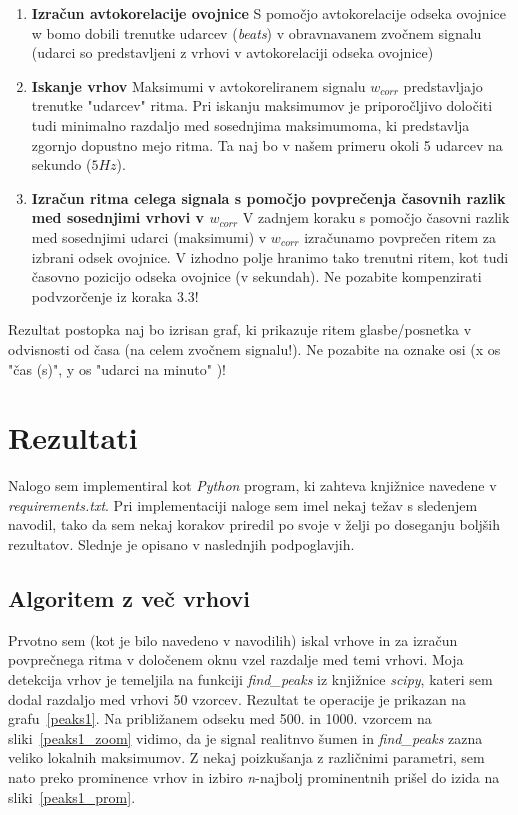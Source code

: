 \documentclass[a4paper,11pt]{article}
\begin{document}
\begin{enumerate}
	\begin{enumerate}[label*=\arabic*.]
	\item \textbf{Izračun avtokorelacije ovojnice}	
	S pomočjo avtokorelacije odseka ovojnice w bomo dobili trenutke udarcev (\textit{beats}) v obravnavanem zvočnem signalu (udarci so predstavljeni z vrhovi v avtokorelaciji odseka ovojnice)
	
	\item \textbf{Iskanje vrhov}
	Maksimumi v avtokoreliranem signalu $w_{corr}$ predstavljajo trenutke "udarcev" ritma. Pri iskanju maksimumov je priporočljivo določiti tudi minimalno razdaljo med sosednjima maksimumoma, ki predstavlja zgornjo dopustno mejo ritma. Ta naj bo v našem primeru okoli 5 udarcev na sekundo ($5 Hz$).	
	
	\item \textbf{Izračun ritma celega signala s pomočjo povprečenja časovnih razlik med sosednjimi vrhovi v $w_{corr}$}
	V zadnjem koraku s pomočjo časovni razlik med sosednjimi udarci (maksimumi) v $w_{corr}$ izračunamo povprečen ritem za izbrani odsek ovojnice. V izhodno polje hranimo tako trenutni ritem, kot tudi časovno pozicijo odseka ovojnice (v sekundah). Ne pozabite kompenzirati podvzorčenje iz koraka 3.3!
	
	\end{enumerate}

\end{enumerate}

Rezultat postopka naj bo izrisan graf, ki prikazuje ritem glasbe/posnetka v odvisnosti od časa (na celem zvočnem signalu!). Ne pozabite na oznake osi (x os "čas (s)", y os "udarci na minuto" )! 

\section{Rezultati}

Nalogo sem implementiral kot \textit{Python} program, ki zahteva knjižnice navedene v \textit{requirements.txt}. Pri implementaciji naloge sem imel nekaj težav s sledenjem navodil, tako da sem nekaj korakov priredil po svoje v želji po doseganju boljših rezultatov. Slednje je opisano v naslednjih podpoglavjih.

\subsection{Algoritem z več vrhovi}

Prvotno sem (kot je bilo navedeno v navodilih) iskal vrhove in za izračun povprečnega ritma v določenem oknu vzel razdalje med temi vrhovi. Moja detekcija vrhov je temeljila na funkciji \textit{find\_peaks} iz knjižnice \textit{scipy}, kateri sem dodal razdaljo med vrhovi 50 vzorcev. Rezultat te operacije je prikazan na grafu~\ref{peaks1}. Na približanem odseku med 500. in 1000. vzorcem na sliki~\ref{peaks1_zoom} vidimo, da je signal realitnvo šumen in \textit{find\_peaks} zazna veliko lokalnih maksimumov. Z nekaj poizkušanja z različnimi parametri, sem nato preko prominence vrhov in izbiro \textit{n}-najbolj prominentnih prišel do izida na sliki~\ref{peaks1_prom}. 
\end{document}
